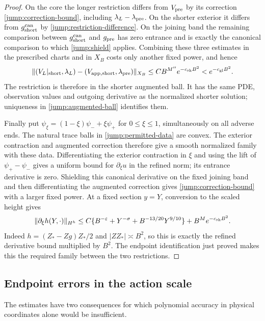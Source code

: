 \begin{proof}
On the core the longer restriction differs from $V_{\rm pre}$ by
its correction \eqref{jump:correction-bound}, including
$\lambda_L-\lambda_{\rm pre}$.  On the shorter exterior it differs
from $g_{\rm short}^{\rm can}$ by
\eqref{jump:restriction-difference}.  On the joining band the
remaining comparison between $g_{\rm short}^{\rm can}$ and
$g_{\rm pre}$ has zero entrance and is exactly the canonical
comparison to which \eqref{jump:shield} applies.  Combining these
three estimates in the prescribed charts and in $X_B$ costs only
another fixed power, and hence
\[
 \|(V_L|_{\rm short},\lambda_L)
       -(V_{\rm app,short},\lambda_{\rm pre})\|_{X_B}
 \leq CB^{M''}e^{-c_{\rm sh}B^2}
                  <e^{-c_{\rm gl}B^2}.
\]
The restriction is therefore in the shorter augmented ball.
It has the same PDE, observation values and outgoing derivative
as the normalized shorter solution; uniqueness in
\eqref{jump:augmented-ball} identifies them.

Finally put $\psi_\xi=(1-\xi)\psi_-+\xi\psi_+$ for
$0\leq\xi\leq1$, simultaneously on all adverse ends.
The natural trace balls in \eqref{jump:permitted-data} are convex.
The exterior contraction and augmented correction therefore give
a smooth normalized family with these data.  Differentiating the
exterior contraction in $\xi$ and using the lift of
$\psi_+-\psi_-$ gives a uniform bound for
$\partial_\xi u$ in the refined norm; its entrance derivative
is zero.  Shielding this canonical derivative on the fixed
joining band and then differentiating the augmented correction
gives \eqref{jump:correction-bound} with a larger fixed power.
At a fixed section $y=Y$, conversion to the scaled height gives
\begin{equation}\label{jump:interpolation-height}
 \|\partial_\xi h(Y,\cdot)\|_{H^h}
 \leq C\{B^{-\varepsilon}+Y^{-\sigma}
                   +B^{-13/20}Y^{9/10}\}
       +B^M e^{-c_{\rm sh}B^2}.
\end{equation}
Indeed $h=(Z_*-Zg)Z_*/2$ and $|ZZ_*|\asymp B^2$, so this is
exactly the refined derivative bound multiplied by $B^2$.
The endpoint identification just proved makes this the required
family between the two restrictions.
\end{proof}

\subsection{Endpoint errors in the action scale}

The estimates have two consequences for which polynomial accuracy
in physical coordinates alone would be insufficient.

